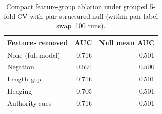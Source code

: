 \begin{table}[t]
\centering
\caption{Compact feature-group ablation under grouped 5-fold CV with pair-structured null (within-pair label swap; 100 runs).}
\label{tab:feature_ablation}
\begin{tabular}{lrr}
\toprule
Features removed & AUC & Null mean AUC \\
\midrule
None (full model) & 0.716 & 0.501 \\
Negation & 0.591 & 0.500 \\
Length gap & 0.716 & 0.501 \\
Hedging & 0.705 & 0.501 \\
Authority cues & 0.716 & 0.501 \\
\bottomrule
\end{tabular}
\end{table}

